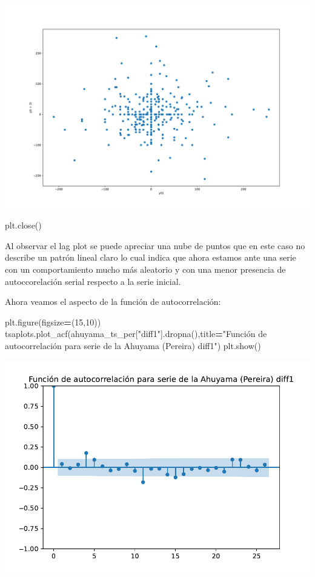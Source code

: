 \documentclass[
]{book}
\newenvironment{Shaded}{\begin{snugshade}}{\end{snugshade}}
\newcommand{\DecValTok}[1]{\textcolor[rgb]{0.00,0.00,0.81}{#1}}
\newcommand{\NormalTok}[1]{#1}
\newcommand{\OperatorTok}[1]{\textcolor[rgb]{0.81,0.36,0.00}{\textbf{#1}}}
\newcommand{\StringTok}[1]{\textcolor[rgb]{0.31,0.60,0.02}{#1}}
\begin{document}
\includegraphics{bookdown-demo_files/figure-latex/unnamed-chunk-91-67.pdf}

\begin{Shaded}
\begin{Highlighting}[]
\NormalTok{plt.close()}
\end{Highlighting}
\end{Shaded}

Al observar el lag plot se puede apreciar una nube de puntos que en este caso no describe un patrón lineal claro lo cual indica que ahora estamos ante una serie con un comportamiento mucho más aleatorio y con una menor presencia de autoccorelación serial respecto a la serie inicial.

Ahora veamos el aspecto de la función de autocorrelación:

\begin{Shaded}
\begin{Highlighting}[]

\NormalTok{plt.figure(figsize}\OperatorTok{=}\NormalTok{(}\DecValTok{15}\NormalTok{,}\DecValTok{10}\NormalTok{))}
\NormalTok{tsaplots.plot\_acf(ahuyama\_ts\_per[}\StringTok{"diff1"}\NormalTok{].dropna(),title}\OperatorTok{=}\StringTok{"Función de autocorrelación para serie de la Ahuyama (Pereira) diff1"}\NormalTok{)}
\NormalTok{plt.show()}
\end{Highlighting}
\end{Shaded}

\includegraphics{bookdown-demo_files/figure-latex/unnamed-chunk-92-69.pdf}
\end{document}
